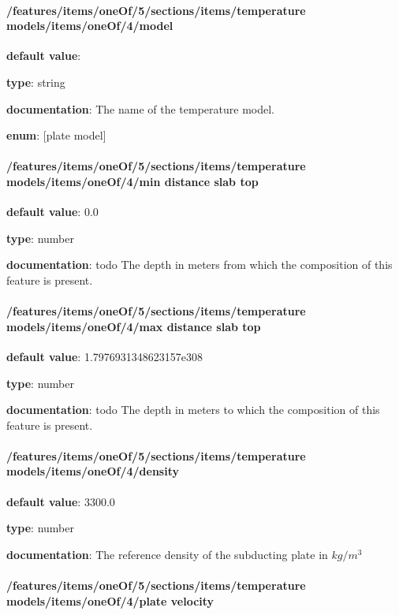 \paragraph{/features/items/oneOf/5/sections/items/temperature models/items/oneOf/4/model} \begin{itemized}
\item {\bf default value}: 
\item {\bf type}: string
\item {\bf documentation}: The name of the temperature model.
\item {\bf enum}: [plate model]\end{itemized}\paragraph{/features/items/oneOf/5/sections/items/temperature models/items/oneOf/4/min distance slab top} \begin{itemized}
\item {\bf default value}: 0.0
\item {\bf type}: number
\item {\bf documentation}: todo The depth in meters from which the composition of this feature is present.
\end{itemized}\paragraph{/features/items/oneOf/5/sections/items/temperature models/items/oneOf/4/max distance slab top} \begin{itemized}
\item {\bf default value}: 1.7976931348623157e308
\item {\bf type}: number
\item {\bf documentation}: todo The depth in meters to which the composition of this feature is present.
\end{itemized}\paragraph{/features/items/oneOf/5/sections/items/temperature models/items/oneOf/4/density} \begin{itemized}
\item {\bf default value}: 3300.0
\item {\bf type}: number
\item {\bf documentation}: The reference density of the subducting plate in $kg/m^3$
\end{itemized}\paragraph{/features/items/oneOf/5/sections/items/temperature models/items/oneOf/4/plate velocity} \begin{itemized}

\end{itemized}
